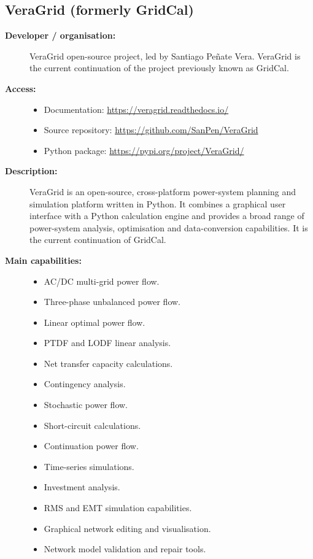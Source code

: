 \subsection{VeraGrid (formerly GridCal)}

\begin{description}

    \item[\textbf{Developer / organisation:}]
    VeraGrid open-source project, led by Santiago Peñate Vera. VeraGrid is
    the current continuation of the project previously known as GridCal.

    \item[\textbf{Access:}] \hfill
    \begin{itemize}
        \item Documentation:
        \url{https://veragrid.readthedocs.io/}

        \item Source repository:
        \url{https://github.com/SanPen/VeraGrid}

        \item Python package:
        \url{https://pypi.org/project/VeraGrid/}
    \end{itemize}

    \item[\textbf{Description:}]
    VeraGrid is an open-source, cross-platform power-system planning and
    simulation platform written in Python. It combines a graphical user
    interface with a Python calculation engine and provides a broad range
    of power-system analysis, optimisation and data-conversion capabilities.
    It is the current continuation of GridCal.

    \item[\textbf{Main capabilities:}] \hfill
    \begin{itemize}
        \item AC/DC multi-grid power flow.
        \item Three-phase unbalanced power flow.
        \item Linear optimal power flow.
        \item PTDF and LODF linear analysis.
        \item Net transfer capacity calculations.
        \item Contingency analysis.
        \item Stochastic power flow.
        \item Short-circuit calculations.
        \item Continuation power flow.
        \item Time-series simulations.
        \item Investment analysis.
        \item RMS and EMT simulation capabilities.
        \item Graphical network editing and visualisation.
        \item Network model validation and repair tools.
    \end{itemize}


\end{description}
